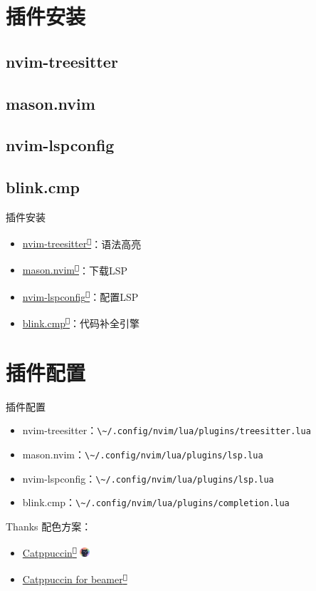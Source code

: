 \documentclass[aspectratio=169]{ctexbeamer}
\newcommand{\nerd}[1]{\texttt{#1}}
\newcommand{\link}[3][]{\href{#3}{#2\textsuperscript{\nerd{}}}}
\begin{document}
\section{插件安装}
  \subsection{nvim-treesitter}
  \subsection{mason.nvim}
  \subsection{nvim-lspconfig}
  \subsection{blink.cmp}

    \begin{frame}{插件安装}
      \begin{itemize}
        \item \link{nvim-treesitter}{https://github.com/nvim-treesitter/nvim-treesitter}：语法高亮
        \item \link{mason.nvim}{https://github.com/williamboman/mason.nvim}：下载LSP
        \item \link{nvim-lspconfig}{https://github.com/neovim/nvim-lspconfig}：配置LSP
        \item \link{blink.cmp}{https://github.com/Saghen/blink.cmp}：代码补全引擎
      \end{itemize}
    \end{frame}

\section{插件配置}

  \begin{frame}{插件配置}
    \begin{itemize}
      \item nvim-treesitter：\lstinline[language={},style=path]{\~/.config/nvim/lua/plugins/treesitter.lua}
      \item mason.nvim：\lstinline[language={},style=path]{\~/.config/nvim/lua/plugins/lsp.lua}
      \item nvim-lspconfig：\lstinline[language={},style=path]{\~/.config/nvim/lua/plugins/lsp.lua}
      \item blink.cmp：\lstinline[language={},style=path]{\~/.config/nvim/lua/plugins/completion.lua}
    \end{itemize}
  \end{frame}

  \begin{frame}{Thanks}
    配色方案：
    \begin{itemize}
      \item \link{Catppuccin}{https://catppuccin.com/} \includegraphics[height=10pt]{./Figures/Catppuccin_logo.png}
      \item \link{Catppuccin for beamer}{https://github.com/atticus-sullivan/beamercolortheme}
    \end{itemize}
  \end{frame}
\end{document}
